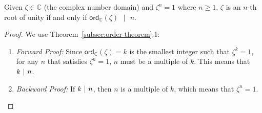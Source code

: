 \begin{tcolorbox}[title={\textbf{\tboxtheorem{\ref*{subsec:roots-theorem}.2} Order of the Root of Unity}}]
Given $\zeta \in \mathbb{C}$ (the complex number domain) and $\zeta^n = 1$ where $n \geq 1$, $\zeta$ is an $n$-th root of unity if and only if $\textsf{ord}_{\mathbb{C}}(\zeta) \text{ } | \text{ } n$.
\end{tcolorbox}
\begin{proof}
    We use 
    Theorem~\ref*{subsec:order-theorem}.1:
    \begin{enumerate}
    \item \textit{Forward Proof:} Since $\textsf{ord}_{\mathbb{C}}(\zeta)=k$ is the smallest integer such that $\zeta^k = 1$, for any $n$ that satisfies $\zeta^n = 1$, $n$ must be a multiple of $k$. This means that $k \text{ } \text{$|$} \text{ } n$.
    \item \textit{Backward Proof:} If $k \text{ } \text{$|$} \text{ } n$, then $n$ is a multiple of $k$, which means that $\zeta^n = 1$. 
    \end{enumerate}
\end{proof}

